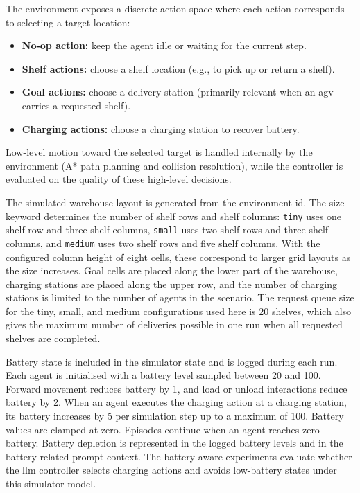 The environment exposes a discrete action space where each action corresponds to selecting a target location:
\begin{itemize}
    \item \textbf{No-op action:} keep the agent idle or waiting for the current step.
    \item \textbf{Shelf actions:} choose a shelf location (e.g., to pick up or return a shelf).
    \item \textbf{Goal actions:} choose a delivery station (primarily relevant when an \gls{agv} carries a requested shelf).
    \item \textbf{Charging actions:} choose a charging station to recover battery.
\end{itemize}
Low-level motion toward the selected target is handled internally by the environment (A* path planning and collision resolution), while the controller is evaluated on the quality of these high-level decisions.

The simulated warehouse layout is generated from the environment id.
The size keyword determines the number of shelf rows and shelf columns: \texttt{tiny} uses one shelf row and three shelf columns, \texttt{small} uses two shelf rows and three shelf columns, and \texttt{medium} uses two shelf rows and five shelf columns.
With the configured column height of eight cells, these correspond to larger grid layouts as the size increases.
Goal cells are placed along the lower part of the warehouse, charging stations are placed along the upper row, and the number of charging stations is limited to the number of agents in the scenario.
The request queue size for the tiny, small, and medium configurations used here is 20 shelves, which also gives the maximum number of deliveries possible in one run when all requested shelves are completed.

Battery state is included in the simulator state and is logged during each run.
Each agent is initialised with a battery level sampled between 20 and 100.
Forward movement reduces battery by 1, and load or unload interactions reduce battery by 2.
When an agent executes the charging action at a charging station, its battery increases by 5 per simulation step up to a maximum of 100.
Battery values are clamped at zero.
Episodes continue when an agent reaches zero battery.
Battery depletion is represented in the logged battery levels and in the battery-related prompt context.
The battery-aware experiments evaluate whether the \gls{llm} controller selects charging actions and avoids low-battery states under this simulator model.

